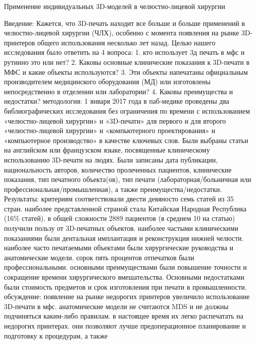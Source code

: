 
Применение индивидуальных 3D-моделей в челюстно-лицевой хирургии

Введение: Кажется, что 3D-печать находит все больше и больше применений в
челюстно-лицевой хирургии (ЧЛХ), особенно с момента появления на рынке
3D-принтеров общего использования несколько лет назад. Целью нашего исследования
было ответить на 4 вопроса: 1. кто использует 3д печать в мфс и рутинно это или
нет? 2. Каковы основные клинические показания к 3D-печати в МФС и какие объекты
используются? 3. Эти объекты напечатаны официальным производителем медицинского
оборудования (МД) или изготовлены непосредственно в отделении или лаборатории?
4. Каковы преимущества и недостатки? методология: 1 января 2017 года в
паб-медике проведены два библиографических исследования без ограничения по
времени с использованием «челюстно-лицевой хирургии» и «3D-печати» для первого и
для второго «челюстно-лицевой хирургии» и «компьютерного проектирования» и
«компьютерное производство» в качестве ключевых слов. Были выбраны статьи на
английском или французском языке, посвященные клиническому использованию
3D-печати на людях. Были записаны дата публикации, национальность авторов,
количество пролеченных пациентов, клинические показания, тип печатного
объекта(ов), тип печати (лабораторная/больничная или
профессиональная/промышленная), а также преимущества/недостатки. Результаты:
критериям соответствовали двести девяносто семь статей из 35 стран. наиболее
представленной страной стала Китайская Народная Республика (16\% статей). в общей
сложности 2889 пациентов (в среднем 10 на статью) получили пользу от
3D-печатных объектов. наиболее частыми клиническими показаниями были
дентальная имплантация и реконструкция нижней челюсти. наиболее часто
печатаемыми объектами были хирургические руководства и анатомические модели.
сорок пять процентов отпечатков были профессиональными. основными
преимуществами были повышение точности и сокращение времени хирургического
вмешательства. Основными недостатками были стоимость предметов и срок
изготовления при печати в промышленности. обсуждение: появление на рынке
недорогих принтеров увеличило использование 3D-печати в мфс. анатомические
модели не считаются MDS и не должны подчиняться каким-либо правилам. в
настоящее время их легко распечатать на недорогих принтерах. они позволяют
лучше предоперационное планирование и подготовку к процедурам, а также
